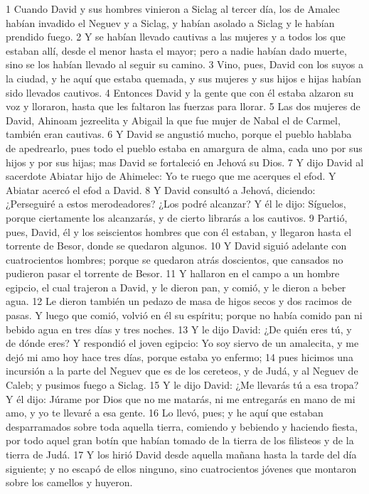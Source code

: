 {1 Cuando David y sus hombres vinieron a Siclag al tercer día, los de Amalec habían invadido el Neguev y a Siclag, y habían asolado a Siclag y le habían prendido fuego.
2 Y se habían llevado cautivas a las mujeres y a todos los que estaban allí, desde el menor hasta el mayor; pero a nadie habían dado muerte, sino se los habían llevado al seguir su camino.
3 Vino, pues, David con los suyos a la ciudad, y he aquí que estaba quemada, y sus mujeres y sus hijos e hijas habían sido llevados cautivos.
4 Entonces David y la gente que con él estaba alzaron su voz y lloraron, hasta que les faltaron las fuerzas para llorar.
5 Las dos mujeres de David, Ahinoam jezreelita y Abigail la que fue mujer de Nabal el de Carmel, también eran cautivas. 
6 Y David se angustió mucho, porque el pueblo hablaba de apedrearlo, pues todo el pueblo estaba en amargura de alma, cada uno por sus hijos y por sus hijas; mas David se fortaleció en Jehová su Dios.
7 Y dijo David al sacerdote Abiatar hijo de Ahimelec: Yo te ruego que me acerques el efod. Y Abiatar acercó el efod a David.
8 Y David consultó a Jehová, diciendo: ¿Perseguiré a estos merodeadores? ¿Los podré alcanzar? Y él le dijo: Síguelos, porque ciertamente los alcanzarás, y de cierto librarás a los cautivos.
9 Partió, pues, David, él y los seiscientos hombres que con él estaban, y llegaron hasta el torrente de Besor, donde se quedaron algunos.
10 Y David siguió adelante con cuatrocientos hombres; porque se quedaron atrás doscientos, que cansados no pudieron pasar el torrente de Besor.
11 Y hallaron en el campo a un hombre egipcio, el cual trajeron a David, y le dieron pan, y comió, y le dieron a beber agua.
12 Le dieron también un pedazo de masa de higos secos y dos racimos de pasas. Y luego que comió, volvió en él su espíritu; porque no había comido pan ni bebido agua en tres días y tres noches.
13 Y le dijo David: ¿De quién eres tú, y de dónde eres? Y respondió el joven egipcio: Yo soy siervo de un amalecita, y me dejó mi amo hoy hace tres días, porque estaba yo enfermo;
14 pues hicimos una incursión a la parte del Neguev que es de los cereteos, y de Judá, y al Neguev de Caleb; y pusimos fuego a Siclag.
15 Y le dijo David: ¿Me llevarás tú a esa tropa? Y él dijo: Júrame por Dios que no me matarás, ni me entregarás en mano de mi amo, y yo te llevaré a esa gente.
16 Lo llevó, pues; y he aquí que estaban desparramados sobre toda aquella tierra, comiendo y bebiendo y haciendo fiesta, por todo aquel gran botín que habían tomado de la tierra de los filisteos y de la tierra de Judá.
17 Y los hirió David desde aquella mañana hasta la tarde del día siguiente; y no escapó de ellos ninguno, sino cuatrocientos jóvenes que montaron sobre los camellos y huyeron.
}
